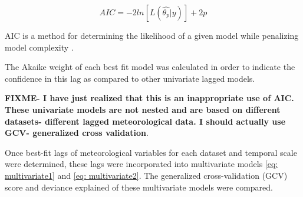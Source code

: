 \begin{equation}
	AIC = -2ln[L(\hat{\theta_{p}}|y)] + 2p
	\label{eq: AIC}
\end{equation}

AIC is a method for determining the likelihood of a given model while penalizing model complexity \citep{JOHNSON2004101}. 

The Akaike weight of each best fit model was calculated in order to indicate the confidence in this lag as compared to other univariate lagged models. 

\textbf{FIXME- I have just realized that this is an inappropriate use of AIC. These univariate models are not nested and are based on different datasets- different lagged meteorological data. I should actually use GCV- generalized cross validation}.

Once best-fit lags of meteorological variables for each dataset and temporal scale were determined, these lags were incorporated into multivariate models \ref{eq: multivariate1} and \ref{eq: multivariate2}. The generalized cross-validation (GCV) score and deviance explained of these multivariate models were compared. 


